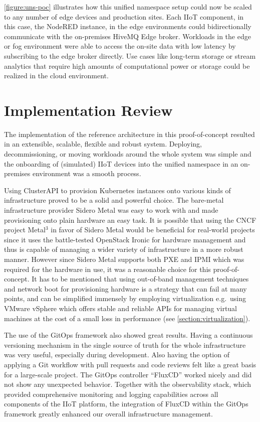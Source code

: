         \noindent \autoref{figure:uns-poc} illustrates how this unified namespace setup could now be scaled to any number of edge devices and production sites. Each IIoT component, in this case, the NodeRED instance, in the edge environments could bidirectionally communicate with the on-premises HiveMQ Edge broker. Workloads in the edge or fog environment were able to access the on-site data with low latency by subscribing to the edge broker directly. Use cases like long-term storage or stream analytics that require high amounts of computational power or storage could be realized in the cloud environment.


    \section{Implementation Review}
        The implementation of the reference architecture in this proof-of-concept resulted in an extensible, scalable, flexible and robust system. Deploying, decommissioning, or moving workloads around the whole system was simple and the onboarding of (simulated) IIoT devices into the unified namespace in an on-premises environment was a smooth process.

        Using ClusterAPI to provision Kubernetes instances onto various kinds of infrastructure proved to be a solid and powerful choice. The bare-metal infrastructure provider Sidero Metal was easy to work with and made provisioning onto plain hardware an easy task. It is possible that using the CNCF project Metal$^3$ in favor of Sidero Metal would be beneficial for real-world projects since it uses the battle-tested OpenStack Ironic for hardware management and thus is capable of managing a wider variety of infrastructure in a more robust manner. However since Sidero Metal supports both PXE and IPMI which was required for the hardware in use, it was a reasonable choice for this proof-of-concept. It has to be mentioned that using out-of-band management techniques and network boot for provisioning hardware is a strategy that can fail at many points, and can be simplified immensely by employing virtualization e.g.\ using VMware vSphere which offers stable and reliable APIs for managing virtual machines at the cost of a small loss in performance (see \autoref{section:virtualization}).

        The use of the GitOps framework also showed great results. Having a continuous versioning mechanism in the single source of truth for the whole infrastructure was very useful, especially during development. Also having the option of applying a Git workflow with pull requests and code reviews felt like a great basis for a large-scale project. The GitOps controller ``FluxCD'' worked nicely and did not show any unexpected behavior. Together with the observability stack, which provided comprehensive monitoring and logging capabilities across all components of the IIoT platform, the integration of FluxCD within the GitOps framework greatly enhanced our overall infrastructure management.

